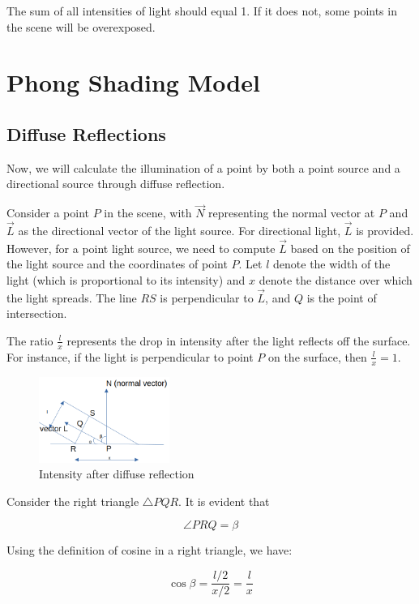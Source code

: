 \documentclass[conference]{IEEEtran}
\begin{document}
The sum of all intensities of light should equal 1. If it does not, some points in the scene will be overexposed.
\section{Phong Shading Model}


 
\subsection{Diffuse Reflections}

Now, we will calculate the illumination of a point by both a point source and a directional source through diffuse reflection.

Consider a point $ P $ in the scene, with $ \vec{N} $ representing the normal vector at $ P $ and $ \vec{L} $ as the directional vector of the light source. For directional light, $ \vec{L} $ is provided. However, for a point light source, we need to compute $ \vec{L} $ based on the position of the light source and the coordinates of point $ P $. Let $ l $ denote the width of the light (which is proportional to its intensity) and $ x $ denote the distance over which the light spreads. The line $ RS $ is perpendicular to $ \vec{L} $, and $ Q $ is the point of intersection.

The ratio $ \frac{l}{x} $ represents the drop in intensity after the light reflects off the surface. For instance, if the light is perpendicular to point $ P $ on the surface, then $ \frac{l}{x} = 1 $.

\begin{figure}[htbp]
    \centerline{\includegraphics[width=0.38\textwidth]{./figs/intensity.png}}
    \caption{Intensity after diffuse reflection}
\end{figure}

Consider the right triangle $ \triangle PQR $. It is evident that 

$$\angle PRQ = \beta$$

Using the definition of cosine in a right triangle, we have:

$$\cos \beta = \frac{l/2}{x/2} = \frac{l}{x}$$
\end{document}
